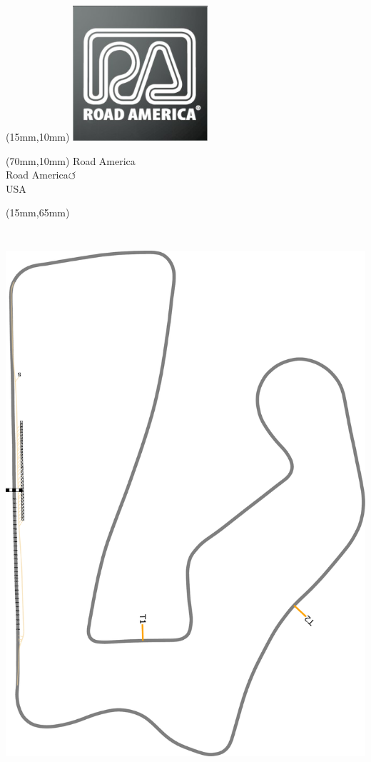 \null\newpage
\begin{textblock*}{50mm}(15mm,10mm)%
\includegraphics[width=50mm]{LG/2015-05-20_00092.png}
\end{textblock*}
\begin{textblock*}{130mm}(70mm,10mm)%
{\fontsize{20}{20}\selectfont Road America\\}
{\fontsize{16}{16}\selectfont Road America\hfill \huge$\circlearrowleft$\\}
{\fontsize{12}{12}\selectfont USA\\}
\end{textblock*}
\begin{textblock*}{185mm}(15mm,65mm)%
\centering
\mbox{\includegraphics[width=185mm,height=210mm,keepaspectratio]{PT/ROAM.pdf}}
\end{textblock*}
